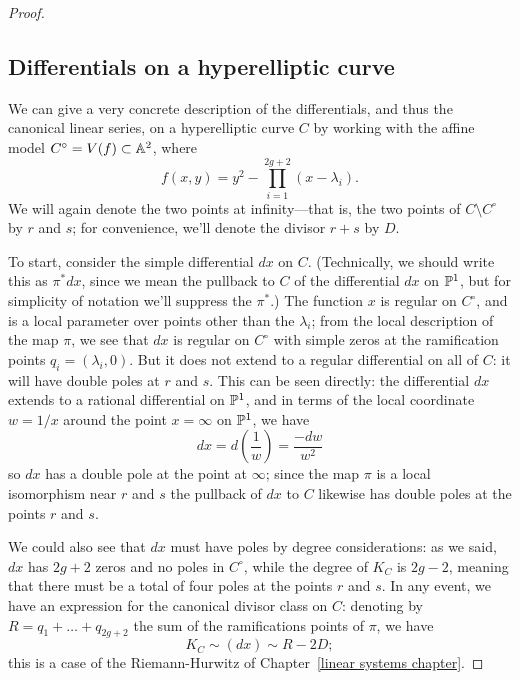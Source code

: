 \begin{proof}
  
  \subsection{Differentials on a hyperelliptic curve}

We can give a very concrete description of the differentials, and thus the canonical linear series, on a hyperelliptic curve $C$ by working with the affine model $C^\circ = V(f) \subset \AA^2$, where
$$
f(x,y) = y^2 - \prod_{i=1}^{2g+2} (x - \lambda_i).
$$
We will again denote the two points at infinity---that is, the two points of $C \setminus C^\circ$ by $r$ and $s$; for convenience, we'll denote the divisor $r+s$ by $D$.

To start, consider the simple differential $dx$ on $C$. (Technically, we should write this as $\pi^*dx$, since we mean the pullback to $C$ of the differential $dx$ on $\PP^1$, but for simplicity of notation we'll suppress the $\pi^*$.)  The function $x$ is regular on $C^\circ$, and is a local parameter over points other than the $\lambda_i$; from the local description of the map $\pi$, we see that $dx$ is regular on $C^\circ$  with simple zeros at the ramification points $q_i = (\lambda_i, 0)$. But it does not extend to a regular differential on all of $C$: it will have double poles at $r$ and $s$.  This can be seen directly: the differential $dx$ extends to a rational differential on $\PP^1$, and in terms of the local coordinate $w = 1/x$ around the point $x = \infty$ on $\PP^1$, we have
$$
dx = d\left(\frac{1}{w}\right) = \frac{-dw}{w^2}
$$
so $dx$ has a double pole at the point at $\infty$; since the map $\pi$ is a local isomorphism near $r$ and $s$ the pullback of $dx$ to $C$ likewise has double poles at the points $r$ and $s$.


We could also see that $dx$ must have poles by degree considerations: as we said, $dx$ has $2g+2$ zeros and no poles in $C^\circ$, while the degree of $K_C$ is $2g-2$, meaning that there must be  a total of four poles at the points $r$ and $s$. In any event, we have an expression for the canonical divisor class on $C$: denoting by $R = q_1 + \dots + q_{2g+2}$ the sum of the ramifications points of $\pi$, we have
$$
K_C \sim (dx) \sim R - 2D;
$$
this is a case of the Riemann-Hurwitz of Chapter~\ref{linear systems chapter}.


\end{proof}
